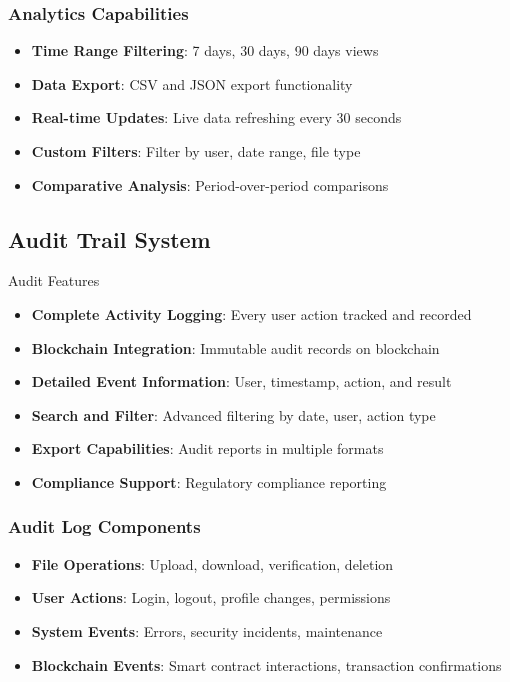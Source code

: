 \documentclass[11pt,a4paper]{article}
\begin{document}
\subsubsection{Analytics Capabilities}
\begin{itemize}
    \item \textbf{Time Range Filtering}: 7 days, 30 days, 90 days views
    \item \textbf{Data Export}: CSV and JSON export functionality
    \item \textbf{Real-time Updates}: Live data refreshing every 30 seconds
    \item \textbf{Custom Filters}: Filter by user, date range, file type
    \item \textbf{Comparative Analysis}: Period-over-period comparisons
\end{itemize}

\subsection{Audit Trail System}

\begin{featurebox}{\faHistory\space Audit Features}
\begin{itemize}
    \item \textbf{Complete Activity Logging}: Every user action tracked and recorded
    \item \textbf{Blockchain Integration}: Immutable audit records on blockchain
    \item \textbf{Detailed Event Information}: User, timestamp, action, and result
    \item \textbf{Search and Filter}: Advanced filtering by date, user, action type
    \item \textbf{Export Capabilities}: Audit reports in multiple formats
    \item \textbf{Compliance Support}: Regulatory compliance reporting
\end{itemize}
\end{featurebox}

\subsubsection{Audit Log Components}
\begin{itemize}
    \item \textbf{File Operations}: Upload, download, verification, deletion
    \item \textbf{User Actions}: Login, logout, profile changes, permissions
    \item \textbf{System Events}: Errors, security incidents, maintenance
    \item \textbf{Blockchain Events}: Smart contract interactions, transaction confirmations
\end{itemize}
\end{document}
